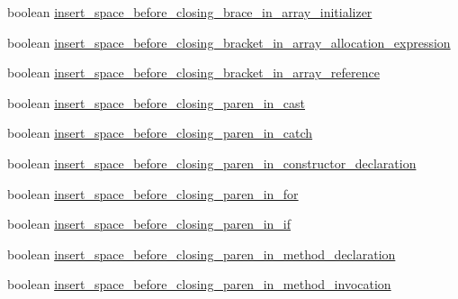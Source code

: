 \begin{DoxyCompactItemize}
\item 
boolean \hyperlink{classorg_1_1eclipse_1_1jdt_1_1ui_1_1tests_1_1refactoring_1_1infra_1_1TestFormatterOptions_a888e26e4b1bff8ac686a902a57cc61b6}{insert\_\-space\_\-before\_\-closing\_\-brace\_\-in\_\-array\_\-initializer}
\item 
boolean \hyperlink{classorg_1_1eclipse_1_1jdt_1_1ui_1_1tests_1_1refactoring_1_1infra_1_1TestFormatterOptions_ac569eab8e1d7ffc7f870e048c9b7eff6}{insert\_\-space\_\-before\_\-closing\_\-bracket\_\-in\_\-array\_\-allocation\_\-expression}
\item 
boolean \hyperlink{classorg_1_1eclipse_1_1jdt_1_1ui_1_1tests_1_1refactoring_1_1infra_1_1TestFormatterOptions_a0839fde6843f2d9b8709923662a11827}{insert\_\-space\_\-before\_\-closing\_\-bracket\_\-in\_\-array\_\-reference}
\item 
boolean \hyperlink{classorg_1_1eclipse_1_1jdt_1_1ui_1_1tests_1_1refactoring_1_1infra_1_1TestFormatterOptions_a3aab63b8cfcc8f7d9937a6f77b9125ef}{insert\_\-space\_\-before\_\-closing\_\-paren\_\-in\_\-cast}
\item 
boolean \hyperlink{classorg_1_1eclipse_1_1jdt_1_1ui_1_1tests_1_1refactoring_1_1infra_1_1TestFormatterOptions_a6a6c6fc28819703c85970806c132a6f5}{insert\_\-space\_\-before\_\-closing\_\-paren\_\-in\_\-catch}
\item 
boolean \hyperlink{classorg_1_1eclipse_1_1jdt_1_1ui_1_1tests_1_1refactoring_1_1infra_1_1TestFormatterOptions_aaf9733c1b81e98d4bc9e11232edb44fd}{insert\_\-space\_\-before\_\-closing\_\-paren\_\-in\_\-constructor\_\-declaration}
\item 
boolean \hyperlink{classorg_1_1eclipse_1_1jdt_1_1ui_1_1tests_1_1refactoring_1_1infra_1_1TestFormatterOptions_a15b563a95f7e77dea771b82d26d3981b}{insert\_\-space\_\-before\_\-closing\_\-paren\_\-in\_\-for}
\item 
boolean \hyperlink{classorg_1_1eclipse_1_1jdt_1_1ui_1_1tests_1_1refactoring_1_1infra_1_1TestFormatterOptions_ac151dd62536dfe9f6f1a1c688db0c01c}{insert\_\-space\_\-before\_\-closing\_\-paren\_\-in\_\-if}
\item 
boolean \hyperlink{classorg_1_1eclipse_1_1jdt_1_1ui_1_1tests_1_1refactoring_1_1infra_1_1TestFormatterOptions_a006782850a11f42a19c250f1580b8fd2}{insert\_\-space\_\-before\_\-closing\_\-paren\_\-in\_\-method\_\-declaration}
\item 
boolean \hyperlink{classorg_1_1eclipse_1_1jdt_1_1ui_1_1tests_1_1refactoring_1_1infra_1_1TestFormatterOptions_a21f0531d2574940f2c4dddc3f875c81e}{insert\_\-space\_\-before\_\-closing\_\-paren\_\-in\_\-method\_\-invocation}

\end{DoxyCompactItemize}

